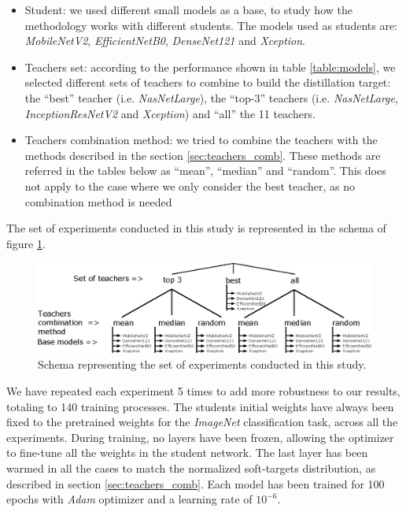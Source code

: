 \documentclass{elsarticle}
\begin{document}
	\begin{itemize}
		\item Student: we used different small models as a base, to study how the methodology works with different students. The models used as students are: \textit{MobileNetV2}, \textit{EfficientNetB0}, \textit{DenseNet121} and \textit{Xception}.
		\item Teachers set: according to the performance shown in table \ref{table:models}, we selected different sets of teachers to combine to build the distillation target: the ``best'' teacher (i.e. \textit{NasNetLarge}), the ``top-3'' teachers (i.e. \textit{NasNetLarge}, \textit{InceptionResNetV2} and \textit{Xception}) and ``all'' the 11 teachers.
		\item Teachers combination method: we tried to combine the teachers with the methods described in the section \ref{sec:teachers_comb}. These methods are referred in the tables below as ``mean'', ``median'' and ``random''. This does not apply to the case where we only consider the best teacher, as no combination method is needed
	\end{itemize}

	The set of experiments conducted in this study is represented in the schema of figure \ref{fig:schema}.
	
\begin{figure}[h!]
	\centering
	\includegraphics[width=0.9\linewidth]{img/schema}
	\caption{Schema representing the set of experiments conducted in this study.}
	\label{fig:schema}
\end{figure}

		
	We have repeated each experiment 5 times to add more robustness to our results, totaling to 140 training processes. The students initial weights have always been fixed to the pretrained weights for the \textit{ImageNet} classification task, across all the experiments. During training, no layers have been frozen, allowing the optimizer to fine-tune all the weights in the student network. The last layer has been warmed in all the cases to match the normalized soft-targets distribution, as described in section \ref{sec:teachers_comb}.  Each model has been trained for 100 epochs with \textit{Adam} optimizer \cite{Kingma14} and a learning rate of $10^{-6}$.
	
\end{document}
